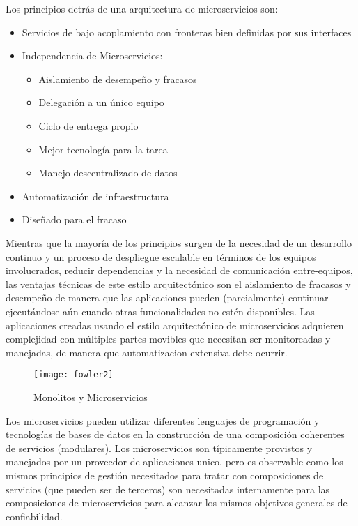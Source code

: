         {Los principios detrás de una arquitectura de microservicios son:}
        
        \begin{itemize}
            \item {Servicios de bajo acoplamiento con fronteras bien definidas por sus
              interfaces}
            \item {Independencia de Microservicios:}
                \begin{itemize}
                \item {Aislamiento de desempeño y fracasos}
                \item {Delegación a un único equipo}
                \item {Ciclo de entrega propio}
                \item {Mejor tecnología para la tarea}
                \item {Manejo descentralizado de datos }
                \end{itemize}
            \item {Automatización de infraestructura}
            \item {Diseñado para el fracaso}
        \end{itemize} 
        Mientras que la mayoría de los principios surgen de la necesidad de un desarrollo continuo y un proceso de despliegue escalable en términos de los equipos involucrados, reducir dependencias y la necesidad de comunicación entre-equipos, las ventajas técnicas de este estilo arquitectónico son el aislamiento de fracasos y desempeño de manera que las aplicaciones pueden (parcialmente) continuar ejecutándose aún cuando otras funcionalidades no estén disponibles. Las aplicaciones creadas usando el estilo arquitectónico de microservicios adquieren complejidad con múltiples partes movibles que necesitan ser monitoreadas y manejadas, de manera que automatizacion extensiva debe ocurrir.
        \begin{figure}[h]
            \centering
            \texttt{[image: fowler2]}
            \caption{Monolitos y Microservicios \parencite{Lewis2016-az}}
            \label{fig:fowler2}
        \end{figure}

        Los microservicios pueden utilizar diferentes lenguajes de programación y tecnologías de bases de datos en la construcción de una composición coherentes de servicios (modulares). Los microservicios son típicamente provistos y manejados por un proveedor de aplicaciones unico, pero es observable como los mismos principios de gestión necesitados para tratar con composiciones de servicios (que pueden ser de terceros) son necesitadas internamente para las composiciones de microservicios para alcanzar los mismos objetivos generales de confiabilidad.
        
